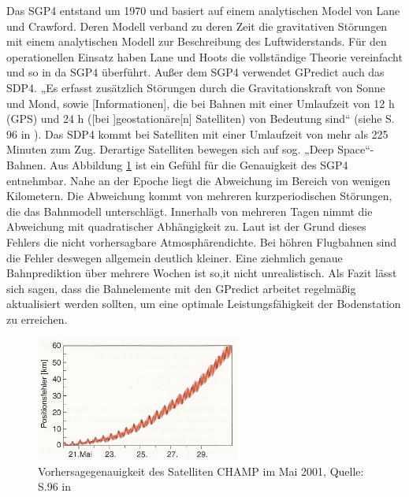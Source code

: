 Das \ac{SGP4} entstand um 1970 und basiert auf einem analytischen Model von Lane und Crawford. Deren Modell verband zu deren Zeit die gravitativen Störungen mit einem analytischen Modell zur Beschreibung des Luftwiderstands. Für den operationellen Einsatz haben Lane und Hoots die vollständige Theorie vereinfacht und so in da \ac{SGP4} überführt. 
\newpar
Außer dem \ac{SGP4} verwendet  GPredict auch das \ac{SDP4}. „Es erfasst zusätzlich Störungen durch die Gravitationskraft von Sonne und Mond, sowie [Informationen], die bei Bahnen mit einer Umlaufzeit von 12 h (GPS) und 24 h ([bei ]geostationäre[n] Satelliten) von Bedeutung sind“ (siehe S. 96 in \cite{HandRaum}). Das \ac{SDP4} kommt bei Satelliten mit einer Umlaufzeit von mehr als 225 Minuten zum Zug. Derartige Satelliten bewegen sich auf sog. „Deep Space“-Bahnen. 
\newpar
Aus Abbildung \ref{fig:sgp4} ist ein Gefühl für die Genauigkeit des \ac{SGP4} entnehmbar. Nahe an der Epoche liegt die Abweichung im Bereich von wenigen Kilometern. Die Abweichung kommt von mehreren kurzperiodischen Störungen, die das Bahnmodell unterschlägt. Innerhalb von mehreren Tagen nimmt die Abweichung mit quadratischer Abhängigkeit zu. Laut \cite{HandRaum} ist der Grund dieses Fehlers die nicht vorhersagbare Atmosphärendichte. Bei höhren Flugbahnen sind die Fehler deswegen allgemein deutlich kleiner. Eine ziehmlich genaue Bahnprediktion über mehrere Wochen ist so,it nicht unrealistisch. Als Fazit lässt sich sagen, dass die Bahnelemente mit den GPredict arbeitet regelmäßig aktualisiert werden sollten, um eine optimale Leistungsfähigkeit der Bodenstation zu erreichen.  
\begin{figure}[h]                                                                           %
	\centering                                                                            	%
	\includegraphics[width=0.6\textwidth]{./images/sgp4_error.jpg}              			%
	\caption[Vorhersagegenauigkeit]{Vorhersagegenauigkeit des Satelliten CHAMP 
	im Mai 2001, Quelle: S.96 in \cite{HandRaum}}                        					%
	\label{fig:sgp4}                                                                        %
\end{figure}                                                                              	%
